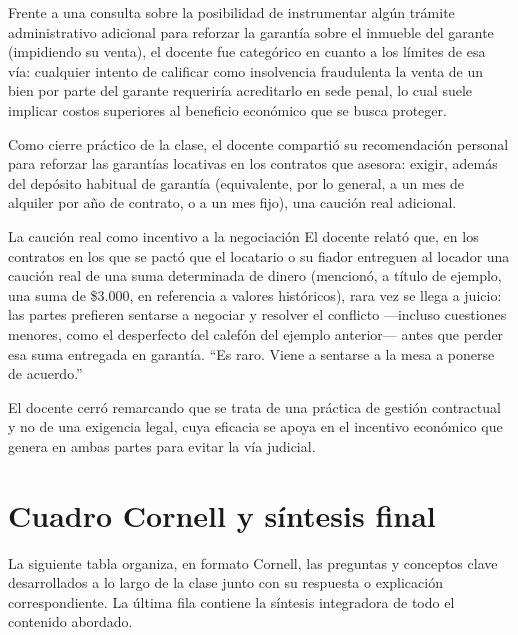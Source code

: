\documentclass[12pt,oneside]{book}
\begin{document}
Frente a una consulta sobre la posibilidad de instrumentar algún trámite administrativo adicional para reforzar la garantía sobre el inmueble del garante (impidiendo su venta), el docente fue categórico en cuanto a los límites de esa vía: cualquier intento de calificar como insolvencia fraudulenta la venta de un bien por parte del garante requeriría acreditarlo en sede penal, lo cual suele implicar costos superiores al beneficio económico que se busca proteger.

Como cierre práctico de la clase, el docente compartió su recomendación personal para reforzar las garantías locativas en los contratos que asesora: exigir, además del depósito habitual de garantía (equivalente, por lo general, a un mes de alquiler por año de contrato, o a un mes fijo), una caución real adicional.

\begin{example}{La caución real como incentivo a la negociación}
El docente relató que, en los contratos en los que se pactó que el locatario o su fiador entreguen al locador una caución real de una suma determinada de dinero (mencionó, a título de ejemplo, una suma de \$3.000, en referencia a valores históricos), rara vez se llega a juicio: las partes prefieren sentarse a negociar y resolver el conflicto —incluso cuestiones menores, como el desperfecto del calefón del ejemplo anterior— antes que perder esa suma entregada en garantía. ``Es raro. Viene a sentarse a la mesa a ponerse de acuerdo.''
\end{example}

El docente cerró remarcando que se trata de una práctica de gestión contractual y no de una exigencia legal, cuya eficacia se apoya en el incentivo económico que genera en ambas partes para evitar la vía judicial.

\chapter{Cuadro Cornell y síntesis final}

La siguiente tabla organiza, en formato Cornell, las preguntas y conceptos clave desarrollados a lo largo de la clase junto con su respuesta o explicación correspondiente. La última fila contiene la síntesis integradora de todo el contenido abordado.
\end{document}
